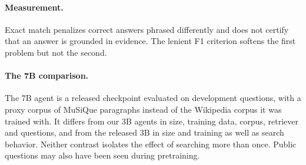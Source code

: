 \paragraph{Measurement.}
Exact match penalizes correct answers phrased differently and does not certify that an answer is grounded in evidence. The lenient F1 criterion softens the first problem but not the second.

\paragraph{The 7B comparison.}
The 7B agent is a released checkpoint evaluated on development questions, with a proxy corpus of MuSiQue paragraphs instead of the Wikipedia corpus it was trained with. It differs from our 3B agents in size, training data, corpus, retriever and questions, and from the released 3B in size and training as well as search behavior. Neither contrast isolates the effect of searching more than once. Public questions may also have been seen during pretraining.
